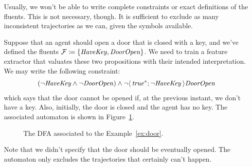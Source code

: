 Usually, we won't be able to write complete constraints or exact definitions
of the fluents. This is not necessary, though. It is sufficient to exclude as
many inconsistent trajectories as we can, given the symbols available.

\begin{example}
	Suppose that an agent should open a door that is closed with a key, and
	we've defined the fluents $\mathcal{F} \coloneqq \{\text{\textit{HaveKey}},
	\text{\textit{DoorOpen}}\}$. We need to train a feature extractor that valuates these
	two propositions with their intended interpretation. We may write the
	following constraint:
	\[
		(\neg \text{\textit{HaveKey}} \land \neg \text{\textit{DoorOpen}})
		\land \neg \langle\, {\text{\textit{true}}^*; \neg \text{\textit{HaveKey}}} \,\rangle\text{\textit{DoorOpen}}
	\]
	which says that the door cannot be opened if, at the previous instant, we
	don't have a key. Also, initially, the door is closed and the agent has no
	key.  The associated automaton is shown in Figure~\ref{fig:door-automa}.
	\begin{figure}[tb]
			\centering
			\caption{The DFA associated to the Example~\ref{ex:door}.}
			\label{fig:door-automa}
	\end{figure}
	Note that we didn't specify that the door should be eventually opened. The
	automaton only excludes the trajectories that certainly can't happen.
	\label{ex:door}
\end{example}

